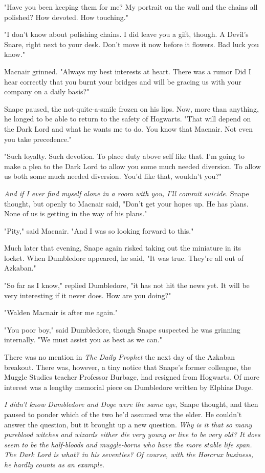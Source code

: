 "Have you been keeping them for me? My portrait on the wall and the chains all polished? How devoted. How touching."

"I don't know about polishing chains. I did leave you a gift, though. A Devil's Snare, right next to your desk. Don't move it now before it flowers. Bad luck you know."

Macnair grinned. "Always my best interests at heart. There was a rumor{\el} Did I hear correctly that you burnt your bridges and will be gracing us with your company on a daily basis?"

Snape paused, the not-quite-a-smile frozen on his lips. Now, more than anything, he longed to be able to return to the safety of Hogwarts. "That will depend on the Dark Lord and what he wants me to do. You know that Macnair. Not even you take precedence."

"Such loyalty. Such devotion. To place duty above self like that. I'm going to make a plea to the Dark Lord to allow you some much needed diversion. To allow us both some much needed diversion. You'd like that, wouldn't you?"

\emph{And if I ever find myself alone in a room with you, I'll commit suicide.} Snape thought, but openly to Macnair said, "Don't get your hopes up. He has plans. None of us is getting in the way of his plans."

"Pity," said Macnair. "And I was so looking forward to this."

Much later that evening, Snape again risked taking out the miniature in its locket. When Dumbledore appeared, he said, "It was true. They're all out of Azkaban."

"So far as I know," replied Dumbledore, "it has not hit the news yet. It will be very interesting if it never does. How are you doing?"

"Walden Macnair is after me again."

"You poor boy," said Dumbledore, though Snape suspected he was grinning internally. "We must assist you as best as we can."

There was no mention in \emph{The Daily Prophet} the next day of the Azkaban breakout. There was, however, a tiny notice that Snape's former colleague, the Muggle Studies teacher Professor Burbage, had resigned from Hogwarts. Of more interest was a lengthy memorial piece on Dumbledore written by Elphias Doge.

\emph{I didn't know Dumbledore and Doge were the same age,} Snape thought, and then paused to ponder which of the two he'd assumed was the elder. He couldn't answer the question, but it brought up a new question. \emph{Why is it that so many pureblood witches and wizards either die very young or live to be very old? It does seem to be the half-bloods and muggle-borns who have the more stable life span. The Dark Lord is what? in his seventies? Of course, with the Horcrux business, he hardly counts as an example.}

